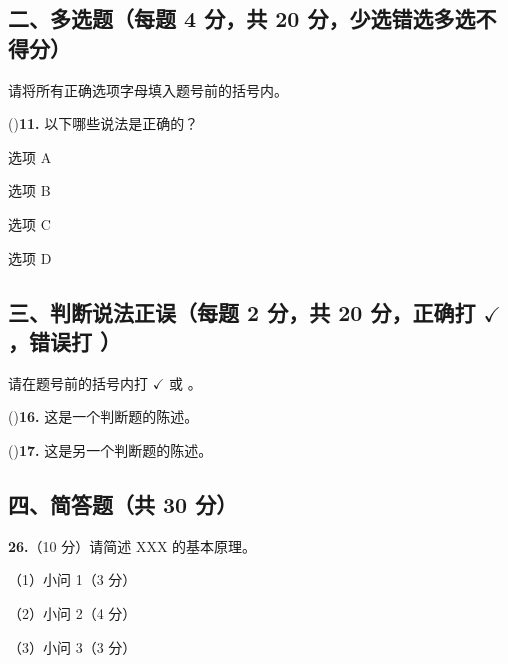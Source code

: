 \documentclass[11pt,a4paper]{article}
\newcommand{\answerlines}[1]{%
  \par\vspace{\dimexpr #1\baselineskip + 0.5em\relax}%
}
\begin{document}
\subsection*{二、多选题（每题 4 分，共 20 分，少选错选多选不得分）}
\vspace{0.2em}
\noindent\small{请将所有正确选项字母填入题号前的括号内。}
\vspace{0.3em}

\noindent(\hspace{1.5em})\enspace\textbf{11.} 以下哪些说法是正确的？

\begin{choices}
\item 选项 A
\item 选项 B
\item 选项 C
\item 选项 D
\end{choices}


\subsection*{三、判断说法正误（每题 2 分，共 20 分，正确打 $\checkmark$，错误打 ）}
\vspace{0.2em}
\noindent\small{请在题号前的括号内打 $\checkmark$ 或 。}
\vspace{0.3em}

\noindent(\hspace{1.5em})\enspace\textbf{16.} 这是一个判断题的陈述。

\noindent(\hspace{1.5em})\enspace\textbf{17.} 这是另一个判断题的陈述。


\subsection*{四、简答题（共 30 分）}
\vspace{0.3em}

\noindent\textbf{26.}（10 分）请简述 XXX 的基本原理。

\par\noindent（1）小问 1（3 分）
\answerlines{4}

\par\noindent（2）小问 2（4 分）
\answerlines{5}

\par\noindent（3）小问 3（3 分）
\answerlines{4}
\end{document}
